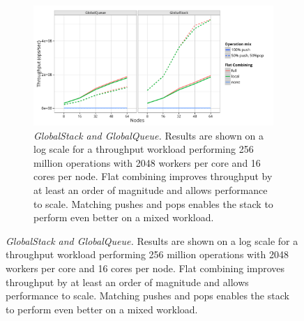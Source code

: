 \begin{figure}[t]
  \centering
  \begin{subfigure}[b]{0.9\textwidth}
  \centering
  \includegraphics[width=\textwidth]{data/plots/vector_perf.pdf}
  \caption{\emph{GlobalStack and GlobalQueue.}
    Results are shown on a log scale for a throughput workload performing 256 million operations with 2048 workers per core and 16 cores per node. Flat combining improves throughput by at least an order of magnitude and allows performance to scale. Matching pushes and pops enables the stack to perform even better on a mixed workload.
  }
  \label{fig:vector}
  \end{subfigure}%
  

\end{figure}
